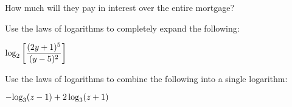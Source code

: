 \documentclass[11pt]{exam}
\begin{document}
\begin{questions}
\begin{compactenum}[(a)]
\item How much will they pay in interest over the entire mortgage?
\end{compactenum}
\newpage

\question[2] Use the laws of logarithms to completely expand the following:
\begin{center}
$\displaystyle{\log_{2}\left[\frac{(2y+1)^5}{(y-5)^2}\right]}$
\end{center}
\vspace{8cm}

\question[2] Use the laws of logarithms to combine the following into a single logarithm:
\begin{center}
$-\displaystyle{\log_{3}(z - 1) + 2\log_{3}(z + 1)}$
\end{center}
\end{questions}
\end{document}
